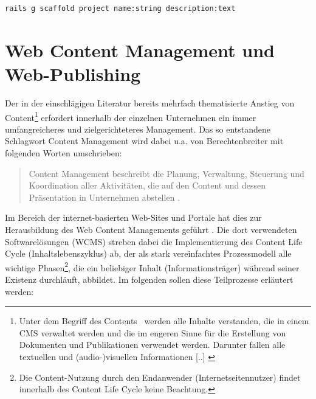 \begin{lstlisting}[caption=Aufruf des Generators zur Erstellung einer MVC-Ressource Projekt]
rails g scaffold project name:string description:text
\end{lstlisting}



\section{Web Content Management und Web-Publishing}
\label{sec:webpublishing}
Der in der einschlägigen Literatur bereits mehrfach thematisierte Anstieg von Content\footnote{
\glqq Unter dem Begriff des \flqq Contents\frqq~ werden alle Inhalte verstanden, die in einem CMS verwaltet werden und die im engeren Sinne für die Erstellung von Dokumenten und Publikationen verwendet werden. Darunter fallen alle textuellen und (audio-)visuellen Informationen [..] \citep[S. 297]{TechnischeDok}
} erfordert innerhalb der einzelnen Unternehmen ein immer umfangreicheres und zielgerichteteres Management. Das so entstandene Schlagwort Content Management wird dabei u.a. von Berechtenbreiter mit folgenden Worten umschrieben:
\begin{quote}
Content Management beschreibt die Planung, Verwaltung, Steuerung und Koordination aller Aktivitäten, die auf den Content und dessen Präsentation in Unternehmen abstellen \cite{Berchtenbreiter}.
\end{quote}

Im Bereich der internet-basierten Web-Sites und Portale hat dies zur Herausbildung des Web Content Managements geführt \citep[][S. 3]{ecm}. Die dort verwendeten Softwarelösungen (WCMS) streben dabei die Implementierung des Content Life Cycle (Inhaltslebenszyklus) ab, der als stark vereinfachtes Prozessmodell alle wichtige Phasen\footnote{Die Content-Nutzung durch den Endanwender (Internetseitennutzer) findet innerhalb des Content Life Cycle keine Beachtung.}, die ein beliebiger Inhalt (Informationsträger) während seiner Existenz durchläuft, abbildet. Im folgenden sollen diese Teilprozesse erläutert werden:

